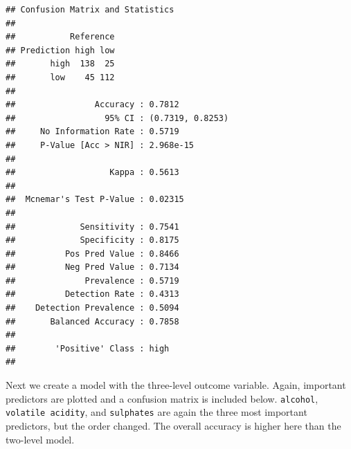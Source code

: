 \documentclass[
]{book}
\newenvironment{Shaded}{\begin{snugshade}}{\end{snugshade}}
\newcommand{\FunctionTok}[1]{\textcolor[rgb]{0.13,0.29,0.53}{\textbf{#1}}}
\newcommand{\NormalTok}[1]{#1}
\newcommand{\SpecialCharTok}[1]{\textcolor[rgb]{0.81,0.36,0.00}{\textbf{#1}}}
\begin{document}
\begin{Shaded}
\end{Shaded}

\begin{verbatim}
## Confusion Matrix and Statistics
## 
##           Reference
## Prediction high low
##       high  138  25
##       low    45 112
##                                           
##                Accuracy : 0.7812          
##                  95% CI : (0.7319, 0.8253)
##     No Information Rate : 0.5719          
##     P-Value [Acc > NIR] : 2.968e-15       
##                                           
##                   Kappa : 0.5613          
##                                           
##  Mcnemar's Test P-Value : 0.02315         
##                                           
##             Sensitivity : 0.7541          
##             Specificity : 0.8175          
##          Pos Pred Value : 0.8466          
##          Neg Pred Value : 0.7134          
##              Prevalence : 0.5719          
##          Detection Rate : 0.4313          
##    Detection Prevalence : 0.5094          
##       Balanced Accuracy : 0.7858          
##                                           
##        'Positive' Class : high            
## 
\end{verbatim}

Next we create a model with the three-level outcome variable. Again, important predictors are plotted and a confusion matrix is included below. \texttt{alcohol}, \texttt{volatile\ acidity}, and \texttt{sulphates} are again the three most important predictors, but the order changed. The overall accuracy is higher here than the two-level model.
\end{document}
